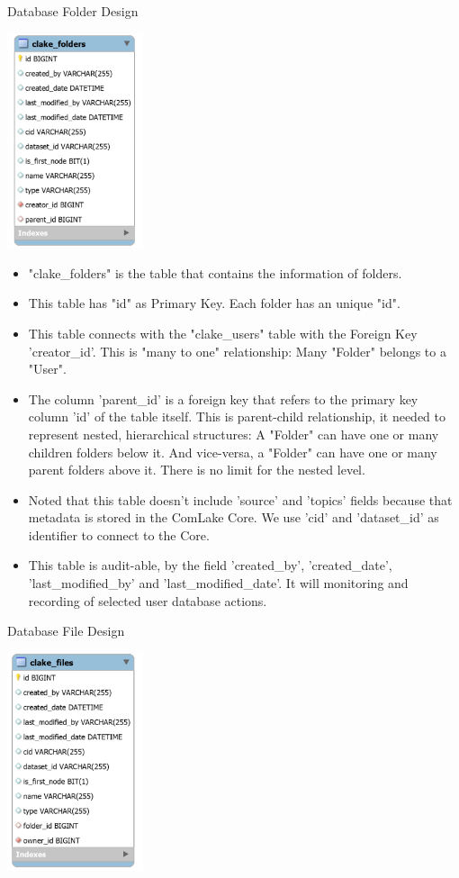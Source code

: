 \begin{table}[H]
  \centering
  \caption{Database Folder Design}
  \label{tbl:dbFolder}
  \includegraphics[width=0.3\textwidth]{images/DatabaseFolderDesign.PNG}
\end{table}
\begin{itemize}
    \item "clake\_folders" is the table that contains the information of folders.
    \item This table has "id" as Primary Key. Each folder has an unique "id". 
    \item This table connects with the "clake\_users" table with the Foreign Key 'creator\_id'. This is "many to one" relationship: Many "Folder" belongs to a "User". 
    \item The column 'parent\_id' is a foreign key that refers to the primary key column 'id' of the table itself. This is parent-child relationship, it needed to represent nested, hierarchical structures: A "Folder" can have one or many children folders below it. And vice-versa, a "Folder" can have one or many parent folders above it. There is no limit for the nested level.
    \item Noted that this table doesn't include 'source' and 'topics' fields because that metadata is stored in the ComLake Core. We use 'cid' and 'dataset\_id' as identifier to connect to the Core. 
    \item This table is audit-able, by the field 'created\_by', 'created\_date', 'last\_modified\_by' and 'last\_modified\_date'. It will monitoring and recording of selected user database actions.
\end{itemize}
\begin{table}[H]
  \centering
  \caption{Database File Design}
  \label{tbl:dbFile}
  \includegraphics[width=0.3\textwidth]{images/DatabaseFileDesign.PNG}
\end{table}

